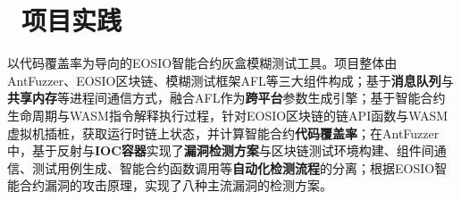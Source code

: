\documentclass{resume}
\begin{document}



\section{\faUsers\ 项目实践}


  \begin{onehalfspacing}
    以代码覆盖率为导向的EOSIO智能合约灰盒模糊测试工具。项目整体由AntFuzzer、EOSIO区块链、模糊测试框架AFL等三大组件构成；基于\textbf{消息队列}与\textbf{共享内存}等进程间通信方式，融合AFL作为\textbf{跨平台}参数生成引擎；基于智能合约生命周期与WASM指令解释执行过程，针对EOSIO区块链的链API函数与WASM虚拟机插桩，获取运行时链上状态，并计算智能合约\textbf{代码覆盖率}；在AntFuzzer中，基于反射与\textbf{IOC容器}实现了\textbf{漏洞检测方案}与区块链测试环境构建、组件间通信、测试用例生成、智能合约函数调用等\textbf{自动化检测流程}的分离；根据EOSIO智能合约漏洞的攻击原理，实现了八种主流漏洞的检测方案。
  \end{onehalfspacing}
\end{document}
